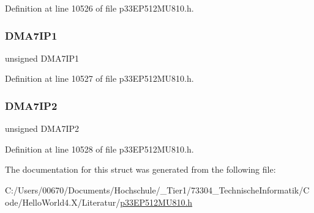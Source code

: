 Definition at line 10526 of file p33\+E\+P512\+M\+U810.\+h.

\mbox{\label{structtag_i_p_c17_b_i_t_s_aed89457da0df581d16994e09f82254ad}} 
\subsubsection{\texorpdfstring{D\+M\+A7\+I\+P1}{DMA7IP1}}
{\footnotesize\ttfamily unsigned D\+M\+A7\+I\+P1}



Definition at line 10527 of file p33\+E\+P512\+M\+U810.\+h.

\mbox{\label{structtag_i_p_c17_b_i_t_s_ab55ff1a4be94206e54fc86eac5cc95b2}} 
\subsubsection{\texorpdfstring{D\+M\+A7\+I\+P2}{DMA7IP2}}
{\footnotesize\ttfamily unsigned D\+M\+A7\+I\+P2}



Definition at line 10528 of file p33\+E\+P512\+M\+U810.\+h.



The documentation for this struct was generated from the following file\+:\begin{DoxyCompactItemize}
\item 
C\+:/\+Users/00670/\+Documents/\+Hochschule/\+\_\+\+Tier1/73304\+\_\+\+Technische\+Informatik/\+Code/\+Hello\+World4.\+X/\+Literatur/\hyperlink{p33_e_p512_m_u810_8h}{p33\+E\+P512\+M\+U810.\+h}\end{DoxyCompactItemize}
